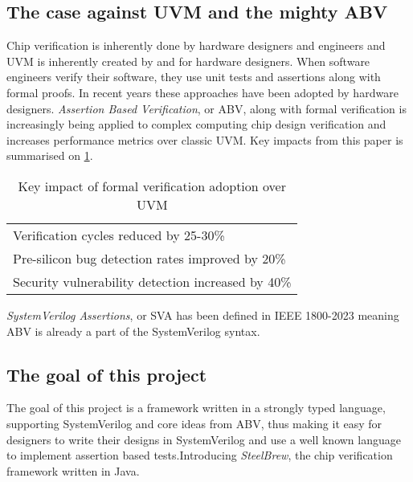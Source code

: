 \subsection{The case against UVM and the mighty ABV}
Chip verification is inherently done by hardware designers and engineers and UVM is inherently created by and for hardware designers. When software engineers verify their software, they use unit tests and assertions along with formal proofs. In recent years these approaches have been adopted by hardware designers. \emph{Assertion Based Verification}, or ABV, along with formal verification is increasingly being applied to complex computing chip design verification and increases performance metrics over classic UVM\cite{reddy_formal_2024}. Key impacts from this paper is summarised on \cref{tbl:ABVOverUVM}.
\begin{table}[H]
    \centering
    \caption{Key impact of formal verification adoption over UVM\cite{reddy_formal_2024}}\label{tbl:ABVOverUVM}
    \begin{tabular}{l}
        \toprule
        Verification cycles reduced by 25-30\%             \\
        Pre-silicon bug detection rates improved by 20\%   \\
        Security vulnerability detection increased by 40\% \\
        \bottomrule
    \end{tabular}
\end{table}
\emph{SystemVerilog Assertions}, or SVA has been defined in IEEE 1800-2023\cite[Chapter 16]{noauthor_ieee_2024} meaning ABV is already a part of the SystemVerilog syntax.
\subsection{The goal of this project}
The goal of this project is a framework written in a strongly typed language, supporting SystemVerilog and core ideas from ABV, thus making it easy for designers to write their designs in SystemVerilog and use a well known language to implement assertion based tests.\newline Introducing \emph{SteelBrew}, the chip verification framework written in Java.